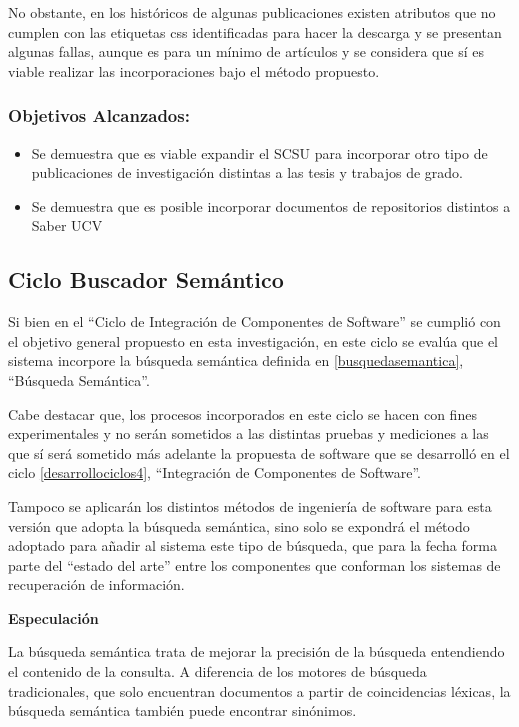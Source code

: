 \documentclass[
  12pt,
  openany]{book}
\begin{document}
No obstante, en los históricos de algunas publicaciones existen atributos que no cumplen con las etiquetas css identificadas para hacer la descarga y se presentan algunas fallas, aunque es para un mínimo de artículos y se considera que sí es viable realizar las incorporaciones bajo el método propuesto.

\hypertarget{objetivos-alcanzados-3}{%
\subsubsection{Objetivos Alcanzados:}\label{objetivos-alcanzados-3}}

\begin{itemize}
\item
  Se demuestra que es viable expandir el SCSU para incorporar otro tipo de publicaciones de investigación distintas a las tesis y trabajos de grado.
\item
  Se demuestra que es posible incorporar documentos de repositorios distintos a Saber UCV
\end{itemize}

\newpage

\hypertarget{desasarrollociclos5}{%
\subsection{Ciclo Buscador Semántico}\label{desasarrollociclos5}}

Si bien en el ``Ciclo de Integración de Componentes de Software'' se cumplió con el objetivo general propuesto en esta investigación, en este ciclo se evalúa que el sistema incorpore la búsqueda semántica definida en \ref{busquedasemantica}, ``Búsqueda Semántica''.

Cabe destacar que, los procesos incorporados en este ciclo se hacen con fines experimentales y no serán sometidos a las distintas pruebas y mediciones a las que sí será sometido más adelante la propuesta de software que se desarrolló en el ciclo \ref{desarrollociclos4}, ``Integración de Componentes de Software''.

Tampoco se aplicarán los distintos métodos de ingeniería de software para esta versión que adopta la búsqueda semántica, sino solo se expondrá el método adoptado para añadir al sistema este tipo de búsqueda, que para la fecha forma parte del ``estado del arte'' entre los componentes que conforman los sistemas de recuperación de información.

\textbf{Especulación}

La búsqueda semántica trata de mejorar la precisión de la búsqueda entendiendo el contenido de la consulta. A diferencia de los motores de búsqueda tradicionales, que solo encuentran documentos a partir de coincidencias léxicas, la búsqueda semántica también puede encontrar sinónimos.
\end{document}
